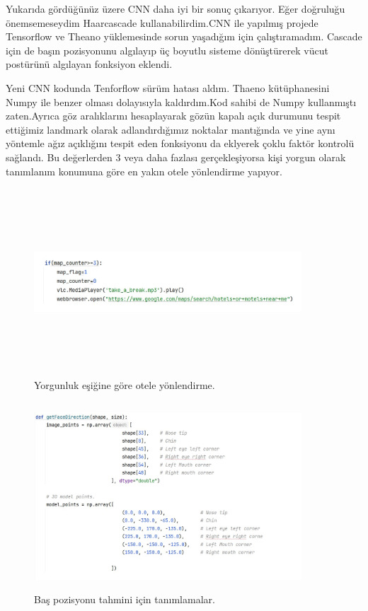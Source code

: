 \documentclass[12pt, a4paper]{article}
\begin{document}
  Yukarıda gördüğünüz üzere CNN daha iyi bir sonuç çıkarıyor. Eğer doğruluğu önemsemeseydim Haarcascade kullanabilirdim.CNN ile yapılmış projede Tensorflow ve Theano yüklemesinde sorun yaşadığım için çalıştıramadım. Cascade için de başın pozisyonunu algılayıp üç boyutlu sisteme dönüştürerek vücut postürünü algılayan fonksiyon eklendi.\par 
  Yeni CNN kodunda Tenforflow sürüm hatası aldım. Thaeno kütüphanesini Numpy ile benzer olması dolayısıyla kaldırdım.Kod sahibi de Numpy kullanmıştı zaten.Ayrıca göz aralıklarını hesaplayarak gözün kapalı açık durumunu tespit ettiğimiz landmark olarak adlandırdığımız noktalar mantığında ve yine aynı yöntemle ağız açıklığını tespit eden fonksiyonu da eklyerek çoklu faktör kontrolü sağlandı. Bu değerlerden 3 veya daha fazlası gerçekleşiyorsa kişi yorgun olarak tanımlanım konumuna göre en yakın otele yönlendirme yapıyor.\newpage
   \begin{figure}
  	\centering
  	\includegraphics[width=10cm, height=7cm, keepaspectratio]{otel.jpg}
  	\caption{Yorgunluk eşiğine göre otele yönlendirme\cite{superthinking}.}
  \end{figure} 
   \begin{figure}
  	\centering
  	\includegraphics[width=10cm, height=7cm, keepaspectratio]{bastanimlama.jpg}
  	\caption{Baş pozisyonu tahmini için tanımlamalar\cite{superthinking}.}
  \end{figure}
\end{document}
